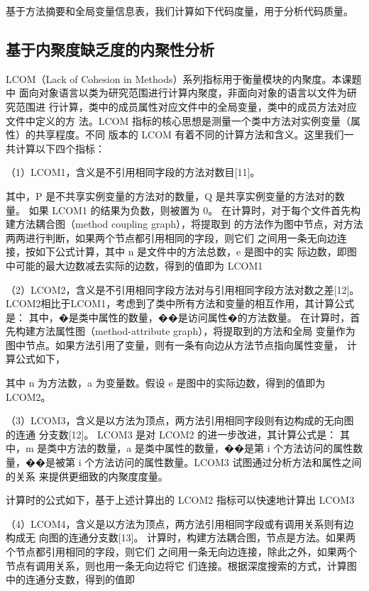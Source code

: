基于方法摘要和全局变量信息表，我们计算如下代码度量，用于分析代码质量。


\subsection{基于内聚度缺乏度的内聚性分析}

LCOM（Lack of Cohesion in Methods）系列指标用于衡量模块的内聚度。本课题中
面向对象语言以类为研究范围进行计算内聚度，非面向对象的语言以文件为研究范围进
行计算，类中的成员属性对应文件中的全局变量，类中的成员方法对应文件中定义的方
法。LCOM 指标的核心思想是测量一个类中方法对实例变量（属性）的共享程度。不同
版本的 LCOM 有着不同的计算方法和含义。这里我们一共计算以下四个指标：


（1）LCOM1，含义是不引用相同字段的方法对数目[11]。

其中，P 是不共享实例变量的方法对的数量，Q 是共享实例变量的方法对的数量。
如果 LCOM1 的结果为负数，则被置为 0。
在计算时，对于每个文件首先构建方法耦合图（method coupling graph），将提取到
的方法作为图中节点，对方法两两进行判断，如果两个节点都引用相同的字段，则它们
之间用一条无向边连接，按如下公式计算，其中 n 是文件中的方法总数，e 是图中的实
际边数，即图中可能的最大边数减去实际的边数，得到的值即为 LCOM1

（2）LCOM2，含义是不引用相同字段方法对与引用相同字段方法对数之差[12]。
LCOM2相比于LCOM1，考虑到了类中所有方法和变量的相互作用，其计算公式是：
其中，�是类中属性的数量，��是访问属性�的方法数量。
在计算时，首先构建方法属性图（method-attribute graph），将提取到的方法和全局
变量作为图中节点。如果方法引用了变量，则有一条有向边从方法节点指向属性变量，
计算公式如下，

其中 n 为方法数，a 为变量数。假设 e 是图中的实际边数，得到的值即为 LCOM2。

（3）LCOM3，含义是以方法为顶点，两方法引用相同字段则有边构成的无向图的连通
分支数[12]。
LCOM3 是对 LCOM2 的进一步改进，其计算公式是：
其中，m 是类中方法的数量，a 是类中属性的数量，��是第 i 个方法访问的属性数
量，��是被第 i 个方法访问的属性数量。LCOM3 试图通过分析方法和属性之间的关系
来提供更细致的内聚度度量。

计算时的公式如下，基于上述计算出的 LCOM2 指标可以快速地计算出 LCOM3

（4）LCOM4，含义是以方法为顶点，两方法引用相同字段或有调用关系则有边构成无
向图的连通分支数[13]。
计算时，构建方法耦合图，节点是方法。如果两个节点都引用相同的字段，则它们
之间用一条无向边连接，除此之外，如果两个节点有调用关系，则也用一条无向边将它
们连接。根据深度搜索的方式，计算图中的连通分支数，得到的值即

